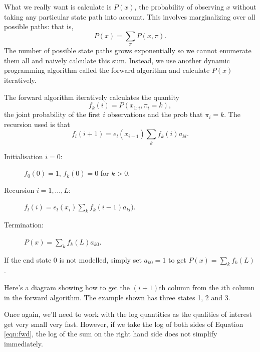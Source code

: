\documentclass[11pt]{article}
\begin{document}
What we really want is calculate is $P(x)$, the probability of observing $x$ without taking any particular state path into account.    This involves marginalizing over all possible paths: that is, 
\[ P(x) = \sum_{\pi} P(x,\pi).\] 
The number of possible state paths grows exponentially so we cannot enumerate them all and naively calculate this sum.  Instead, we use another dynamic programming algorithm called the forward algorithm and calculate $P(x)$ iteratively.  

The forward algorithm iteratively calculates the quantity \[f_k(i) = P(x_{1:i},\pi_i = k),\] the joint  probability  of the  first $i$ observations and the prob that $\pi_i = k$.  The recursion used is that 
\begin{equation} f_l(i+1) = e_l(x_{i+1}) \sum_k f_k(i)a_{kl}. \label{eqn:fwd} \end{equation}
\begin{description}
\item[Initialisation $i = 0$:] $f_0(0) = 1$, $f_k(0) = 0$ for $k>0$.
\item[Recursion $i = 1,\ldots,L$:] $f_l(i) = e_l(x_i) \sum_k  f_k(i-1)a_{kl})$.
\item[Termination:] $P(x) = \sum_k f_k(L)a_{k0}$.
\end{description}
If the end state $0$ is not modelled, simply set $a_{k0} = 1$ to get $P(x) = \sum_k f_k(L)$.

Here's a diagram showing how to get the $(i+1)$th column from the $i$th column in the forward algorithm.  The example shown has three states 1, 2 and 3.



Once again, we'll need to work with the log quantities  as the qualities of interest  get very small very fast.  However, if we take the log of both sides of Equation \ref{eqn:fwd}, the log of the sum on the right hand side does not simplify immediately.
\end{document}
